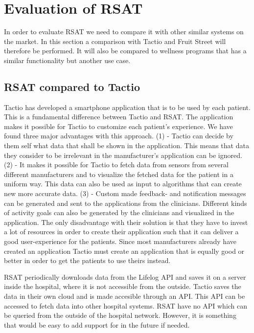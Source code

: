 \documentclass{cslthse-msc}
\begin{document}

\section{Evaluation of RSAT}

In order to evaluate RSAT we need to compare it with other similar systems on the market. In this section a comparison with Tactio and Fruit Street will therefore be performed. It will also be compared to wellness programs that has a similar functionality but another use case. 

\subsection{RSAT compared to Tactio}

Tactio has developed a smartphone application that is to be used by each patient. This is a fundamental difference between Tactio and RSAT. The application makes it possible for Tactio to customize each patient’s experience. We have found three major advantages with this approach. (1) - Tactio can decide by them self what data that shall be shown in the application. This means that data they consider to be irrelevant in the manufacturer’s application can be ignored. (2) - It makes it possible for Tactio to fetch data from sensors from several different manufacturers and to visualize the fetched data for the patient in a uniform way. This data can also be used as input to algorithms that can create new more accurate data. (3) - Custom made feedback- and notification messages can be generated and sent to the applications from the clinicians. Different kinds of activity goals can also be generated by the clinicians and visualized in the application. The only disadvantage with their solution is that they have to invest a lot of resources in order to create their application such that it can deliver a good user-experience for the patients. Since most manufacturers already have created an application Tactio must create an application that is equally good or better in order to get the patients to use theirs instead. 

RSAT periodically downloads data from the Lifelog API and saves it on a server inside the hospital, where it is not accessible from the outside. Tactio saves the data in their own cloud and is made accesible through an API. This API can be accessed to fetch data into other hospital systems. RSAT have no API which can be queried from the outside of the hospital network. However, it is something that would be easy to add support for in the future if needed.  
\end{document}

